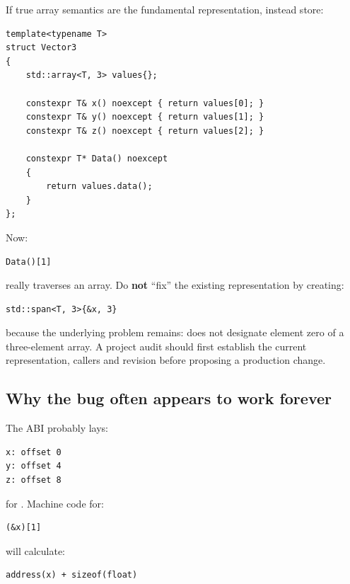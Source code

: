 If true array semantics are the fundamental representation, instead store:

\begin{verbatim}
template<typename T>
struct Vector3
{
    std::array<T, 3> values{};

    constexpr T& x() noexcept { return values[0]; }
    constexpr T& y() noexcept { return values[1]; }
    constexpr T& z() noexcept { return values[2]; }

    constexpr T* Data() noexcept
    {
        return values.data();
    }
};
\end{verbatim}

Now:

\begin{verbatim}
Data()[1]
\end{verbatim}

really traverses an array. Do \textbf{not} ``fix'' the existing representation by creating:

\begin{verbatim}
std::span<T, 3>{&x, 3}
\end{verbatim}

because the underlying problem remains:  does not designate element zero of a three-element  array. A project audit should first establish the current representation, callers and revision before proposing a production change.

\subsection{Why the bug often appears to work forever}\label{05-engine-i-ch003-why-the-bug-often-appears-to-work-forever}

\hypertarget{05-engine-i-ch003-why-the-bug-often-appears-to-work-forever}{}

The ABI probably lays:

\begin{verbatim}
x: offset 0
y: offset 4
z: offset 8
\end{verbatim}

for . Machine code for:

\begin{verbatim}
(&x)[1]
\end{verbatim}

will calculate:

\begin{verbatim}
address(x) + sizeof(float)
\end{verbatim}

